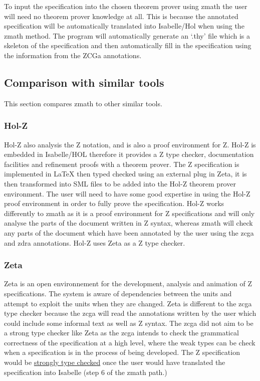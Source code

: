 To input the specification into the chosen theorem prover using \gls{zmath} the
user will need no theorem prover knowledge at all. This is because the annotated
specification will be automatically translated into Isabelle/Hol when using the
\gls{zmath} method. The program will automatically generate an `.thy' file which
is a skeleton of the specification and then automatically fill in the
specification using the information from the ZCGa annotations.

\subsection{Comparison with similar tools}
\label{subsec:provingSystemsForZ}

This section compares \gls{zmath} to other similar tools.

\subsubsection{Hol-Z}
Hol-Z \cite{hol-z} also analysis the Z notation, and is also a
proof environment for Z. Hol-Z is embedded in Isabelle/HOL therefore it provides
a Z type checker, documentation facilities and refinement proofs with a theorem
prover. The Z specification is implemented in \LaTeX{} then typed checked using
an external plug in Zeta, it is then transformed into SML files to be added into
the Hol-Z theorem prover environment. The user will need to have some good
expertise in using the Hol-Z proof environment in order to fully prove the
specification. Hol-Z works differently to \gls{zmath} as it is a proof
environment for Z specifications and will only analyse the parts of the document
written in Z syntax, whereas \gls{zmath} will check any parts of the document
which have been annotated by the user using the \gls{zcga} and \gls{zdra}
annotations. Hol-Z uses Zeta \cite{zeta} as a Z type checker.

\subsubsection{Zeta}
Zeta \cite{zeta} is an open environnement for the development, analysis and
animation of Z specifications. The system is aware of dependencies between the
units and attempt to exploit the units when they are changed. Zeta is different
to the \gls{zcga} type checker because the \gls{zcga} will read the annotations
written by the user which could include some informal text as well as Z syntax.
The \gls{zcga} did not aim to be a strong type checker like Zeta as the
\gls{zcga} intends to check the grammatical correctness of the specification at
a high level, where the weak types can be check when a specification is in the
process of being developed. The Z specification would be \underline{strongly
type checked} once the user would have translated the specification into
Isabelle (step 6 of the \gls{zmath} path.)

